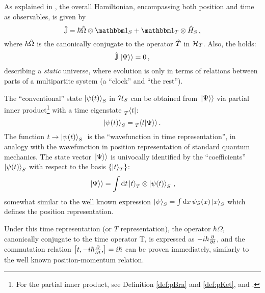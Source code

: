 As explained in \cite{Lloyd:Time, Maccone:Pauli}, the overall Hamiltonian,
encompassing both position and time as observables, is given by
\begin{equation}\label{eq:pwHamiltonian}
  \op{\mathbb{J}} = \hbar\op{\Omega}\ox\idop_S + \idop_T\ox\op{H}_S \,\text{,}
\end{equation}
where $\hbar\hat{\Omega}$ is the canonically conjugate to the operator $\hat{T}$ in $\mathcal{H}_T$.
Also, the  holds:
\begin{equation}\label{eq:Wheeler-DeWitt}
  \hat{\mathbb{J}}\left.\left| \Psi \right\rangle\right\rangle = 0 \,\text{,}
\end{equation}
describing a \emph{static} universe, where evolution is only
in terms of relations between parts of a multipartite system
(a ``clock'' and ``the rest'').


The ``conventional'' state $\ket{\psi(t)}_S$ in $\mathcal{H}_S$
can be obtained from $\left.\left| \Psi \right\rangle\right\rangle$ via partial inner product\footnote{
  For the partial inner product,
  see Definition \ref{def:pBra} and \ref{def:pKet},
  and \cite[.3]{QMT_Jacobs}.
}
with a time eigenstate $\prescript{}{T}{\bra{t}}$:
\begin{equation*}
  \ket{\psi(t)}_S = \prescript{}{T}{\!\left.\left\langle t \middle| \Psi \right\rangle\right\rangle} \, \text{.}
\end{equation*}
The function $ t \rightarrow \ket{\psi(t)}_S \; $ is the
``wavefunction in time representation'', in analogy
with the wavefunction in position representation of standard quantum mechanics.
The state vector $\left.\left| \Psi \right\rangle\right\rangle$ is univocally identified by the ``coefficients'' $\ket{\psi(t)}_S$
with respect to the basis $\left\{\ket{t}_T\right\}$:
\begin{equation*}
  \left.\left| \Psi \right\rangle\right\rangle = \int \dd{t} \ket{t}_T \otimes \ket{\psi(t)}_S \, \text{,}
\end{equation*}
somewhat similar to the well known expression $\ket{\psi}_S = \int \dd{x} \psi_{S}(x) \ket{x}_S$
which defines the position representation.

Under this time representation (or $T$ representation), the operator $\hbar\Omega$,
canonically conjugate to the time operator T, is expressed as $-i\hbar\pdv{t}$,
and the commutation relation $\comm{t, -i\hbar\pdv{t}}{} = i\hbar$ can be proven
immediately, similarly to the well known position-momentum relation.

